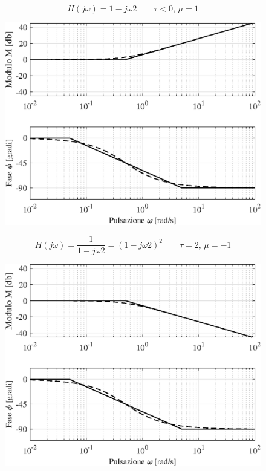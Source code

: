 \begin{nexample}
	\[ H(j\omega) = 1-j\omega2 \qquad\tau<0, \, \mu = 1 \]
\begin{figure}[H]
	\centering
	\includegraphics[width=0.7\linewidth]{immagini/cap6_Bode/es3}
	\label{fig:Bode_es3}
\end{figure}	
\end{nexample}

\begin{nexample}
	\[ H(j\omega) = \frac{1}{1-j\omega2} = (1-j\omega2)^2 \qquad\tau = 2, \, \mu = -1 \]
\begin{figure}[H]
	\centering
	\includegraphics[width=0.7\linewidth]{immagini/cap6_Bode/es4}
	\label{fig:Bode_es4}
\end{figure}	
\end{nexample}

